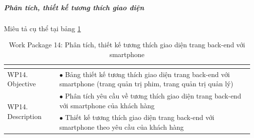 \documentclass[a4paper]{book}
\begin{document}
\subparagraph{Phân tích, thiết kế tương thích giao diện} Miêu tả cụ thể tại bảng \ref{table:backend_thietke_giaodien_tuongthich}
\begin{table}[h!]
	\begin{center}
		\begin{tabular}{|p{4cm}|p{10cm}|}
			\hline
			\multicolumn{2}{|c|}{\cellcolor[HTML]{363636}{\color[HTML]{FFFFFF}Work package 14: Phân tích, thiết kế tương thích giao diện trang back-end}}\\
			\hline
			\multirow{1}{*}{WP14. Objective} & $\bullet$ Bảng thiết kế tương thích giao diện trang back-end với smartphone (trang quản trị phim, trang quản trị quản lý)\\
			\hline
			\multirow{2}{*}{WP14. Description} & $\bullet$ Phân tích yêu cầu về tương thích giao diện trang back-end với smartphone của khách hàng \\
			& $\bullet$ Thiết kế tương thích giao diện trang back-end với smartphone theo yêu cầu của khách hàng\\
			\hline
		\end{tabular}
		\caption{Work Package 14: Phân tích, thiết kế tương thích giao diện trang back-end với smartphone}
		\label{table:backend_thietke_giaodien_tuongthich}
	\end{center}
\end{table}
\end{document}
